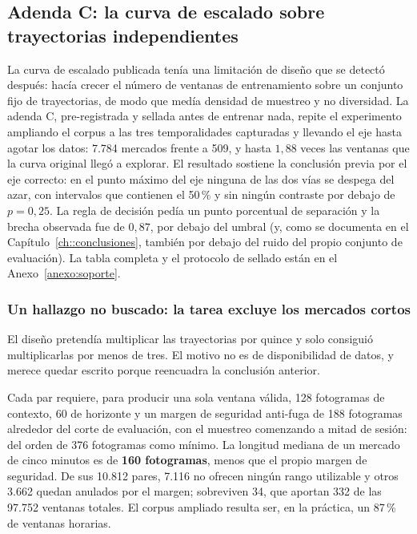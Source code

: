 \subsection{Adenda C: la curva de escalado sobre trayectorias independientes}
\label{sec::escalado_trayectorias}

La curva de escalado publicada tenía una limitación de diseño que se detectó después: hacía
crecer el número de ventanas de entrenamiento sobre un conjunto fijo de trayectorias, de
modo que medía densidad de muestreo y no diversidad. La adenda C, pre-registrada y sellada
antes de entrenar nada, repite el experimento ampliando el corpus a las tres temporalidades
capturadas y llevando el eje hasta agotar los datos: 7.784 mercados frente a 509, y hasta
$1{,}88$ veces las ventanas que la curva original llegó a explorar. El resultado sostiene
la conclusión previa por el eje correcto: en el punto máximo del eje ninguna de las dos
vías se despega del azar, con intervalos que contienen el 50\,\% y sin ningún contraste por
debajo de $p = 0{,}25$. La regla de decisión pedía un punto porcentual de separación y la
brecha observada fue de $0{,}87$, por debajo del umbral (y, como se documenta en el
Capítulo~\ref{ch::conclusiones}, también por debajo del ruido del propio conjunto de
evaluación). La tabla completa y el protocolo de sellado están en el
Anexo~\ref{anexo:soporte}.

\subsubsection{Un hallazgo no buscado: la tarea excluye los mercados cortos}

El diseño pretendía multiplicar las trayectorias por quince y solo consiguió multiplicarlas
por menos de tres. El motivo no es de disponibilidad de datos, y merece quedar escrito
porque reencuadra la conclusión anterior.

Cada par requiere, para producir una sola ventana válida, 128 fotogramas de contexto, 60
de horizonte y un margen de seguridad anti-fuga de 188 fotogramas alrededor del corte de
evaluación, con el muestreo comenzando a mitad de sesión: del orden de 376 fotogramas como
mínimo. La longitud mediana de un mercado de cinco minutos es de \textbf{160 fotogramas},
menos que el propio margen de seguridad. De sus 10.812 pares, 7.116 no ofrecen ningún
rango utilizable y otros 3.662 quedan anulados por el margen; sobreviven 34, que aportan
332 de las 97.752 ventanas totales. El corpus ampliado resulta ser, en la práctica, un
87\,\% de ventanas horarias.

